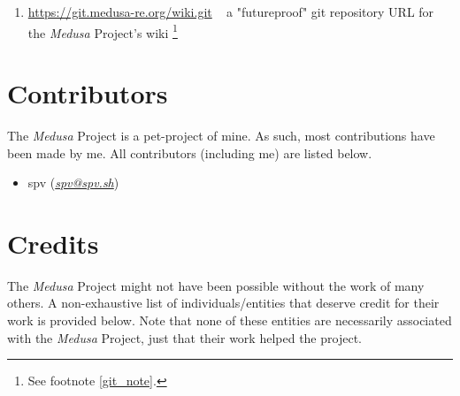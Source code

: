 \documentclass{article}
\newcommand{\Medusa}{\textit{Medusa}\xspace}
\begin{document}
\begin{enumerate}
		\item \href{https://www.gitlab.com/MedusaRE/wiki.git}{https://git.medusa-re.org/wiki.git}
		~ a "futureproof" git repository URL for the \Medusa Project's wiki
		\footnote{See footnote \ref{git_note}.}
	\end{enumerate}

	\section{Contributors}
	The \Medusa Project is a pet-project of mine. As such, most
	contributions have been made by me. All contributors (including me) are
	listed below.

	\begin{itemize}
		\item spv (\textit{\href{mailto:spv@spv.sh}{spv@spv.sh}})
	\end{itemize}

	\section{Credits}
	The \Medusa Project might not have been possible without the work of many
	others. A non-exhaustive list of individuals/entities that deserve credit
	for their work is provided below. Note that none of these entities are
	necessarily associated with the \Medusa Project, just that their work helped
	the project.

\end{document}
